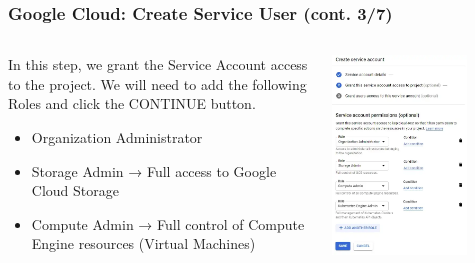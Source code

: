 \documentclass[aspectratio=169]{beamer}
\begin{document}
\begin{frame}
	\frametitle{Google Cloud: Create Service User (cont. 3/7)}
	\begin{columns}
		\begin{column}{0.5\textwidth}
			In this step, we grant the Service Account access to the project. We will need to add the following Roles and click the CONTINUE button.
			\begin{itemize}
				\item Organization Administrator
				\item Storage Admin → Full access to Google Cloud Storage
				\item Compute Admin → Full control of Compute Engine resources (Virtual Machines)
			\end{itemize}
		\end{column}
		\begin{column}{0.5\textwidth}
			\begin{center}
				\includegraphics[width=0.75\textwidth]{../images/gcp-serv-acct3.png}
			\end{center}
		\end{column}
	\end{columns}
\end{frame}
\end{document}
